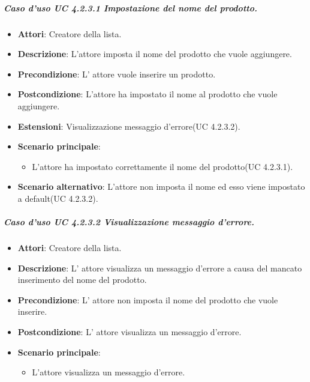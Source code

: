 \subparagraph{Caso d'uso UC 4.2.3.1 Impostazione del nome del prodotto.}
	\begin{itemize}
		\item\textbf{Attori}: Creatore della lista.
		\item\textbf{Descrizione}: L'attore imposta il nome del prodotto che vuole aggiungere.
		\item\textbf{Precondizione}: L' attore vuole inserire un prodotto.
		\item\textbf{Postcondizione}: L'attore ha impostato il nome al prodotto che vuole aggiungere.
		\item\textbf{Estensioni}: Visualizzazione messaggio d'errore(UC 4.2.3.2).
		\item\textbf{Scenario principale}:
			\begin{itemize}
				\item L'attore ha impostato correttamente il nome del prodotto(UC 4.2.3.1). 
			\end{itemize}
		\item\textbf{Scenario alternativo}: L'attore non imposta il nome ed esso viene impostato a default(UC 4.2.3.2).
		
	\end{itemize}
	
	
\subparagraph{Caso d'uso UC 4.2.3.2 Visualizzazione messaggio d'errore.}
	\begin{itemize}
		\item\textbf{Attori}: Creatore della lista.
		\item\textbf{Descrizione}: L' attore visualizza un messaggio d'errore a causa del mancato inserimento del nome del prodotto.
		\item\textbf{Precondizione}: L' attore non imposta il nome del prodotto che vuole inserire.
		\item\textbf{Postcondizione}: L' attore visualizza un messaggio d'errore.
		\item\textbf{Scenario principale}:
			\begin{itemize}
				\item L'attore visualizza un messaggio d'errore. 
			\end{itemize}
		
	\end{itemize}
	
